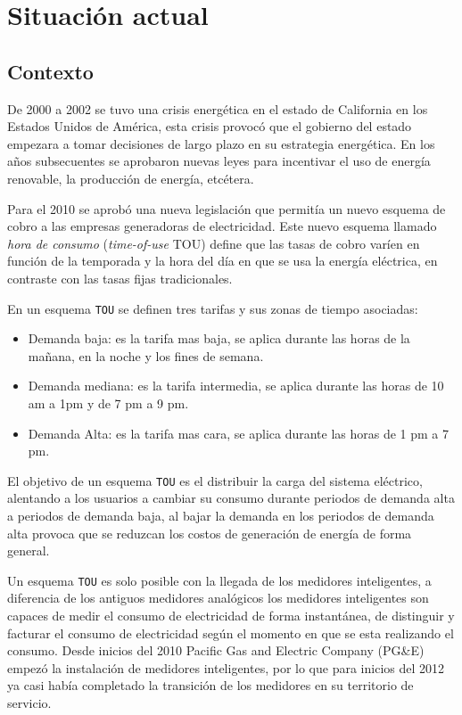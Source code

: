 \chapter{Situación actual}

\section{Contexto}
De 2000 a 2002 se tuvo una crisis energética en el estado de California en los
Estados Unidos de América, esta crisis provocó que el gobierno del estado empezara a
tomar decisiones de largo plazo en su estrategia energética. En los años
subsecuentes se aprobaron nuevas leyes para incentivar el uso de energía renovable,
la producción de energía, etcétera.

Para el 2010 se aprobó una nueva legislación que permitía un nuevo esquema
de cobro a las empresas generadoras de electricidad. Este nuevo esquema
llamado \textit{hora de consumo} (\textit{time-of-use} TOU) define que las
tasas de cobro varíen en función de la temporada y la hora del día en que
se usa la energía eléctrica, en contraste con las tasas fijas tradicionales.

En un esquema \texttt{TOU} se definen tres tarifas y sus zonas de tiempo asociadas:

\begin{itemize}
\item  Demanda baja: es la tarifa mas baja, se aplica durante las horas de la
  mañana, en la noche y los fines de semana.
\item Demanda mediana: es la tarifa intermedia, se aplica durante las horas de
  10 am a 1pm y de 7 pm a 9 pm.
\item Demanda Alta: es la tarifa mas cara, se aplica durante las horas de
  1 pm a 7 pm.
\end{itemize}

El objetivo de un esquema \texttt{TOU} es el distribuir la carga del sistema
eléctrico, alentando a los usuarios a cambiar su consumo durante periodos
de demanda alta a periodos de demanda baja, al bajar la demanda en los periodos
de demanda alta provoca que se reduzcan los costos de generación de energía de
forma general.

Un esquema \texttt{TOU} es solo posible con la llegada de los medidores
inteligentes, a diferencia de los antiguos medidores analógicos los medidores
inteligentes son capaces de medir el consumo de electricidad de forma instantánea,
de distinguir y facturar el consumo de electricidad según el momento en que se
esta realizando el consumo. Desde inicios del 2010 Pacific Gas and
Electric Company (PG\&E) empezó la instalación
de medidores inteligentes, por lo que para inicios del 2012 ya casi había
completado la transición de los medidores en su territorio de servicio.

